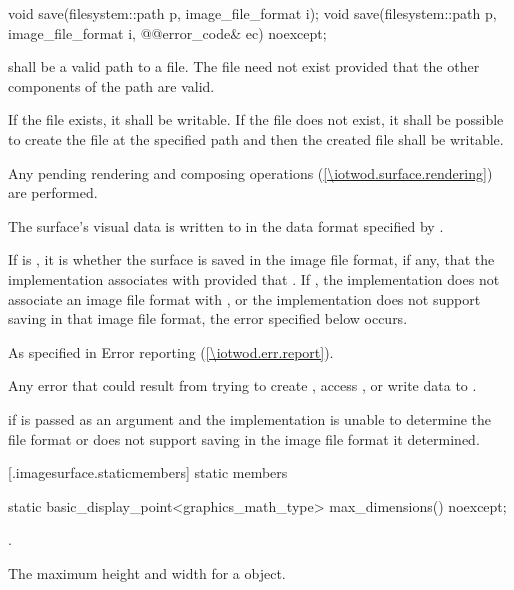 %
\begin{itemdecl}
void save(filesystem::path p, image_file_format i);
void save(filesystem::path p, image_file_format i, @\stdqualifier{}@error_code& ec) noexcept;
\end{itemdecl}
\begin{itemdescr}
\pnum
\requires
{} shall be a valid path to a file. The file need not exist provided that the other components of the path are valid.

\pnum
If the file exists, it shall be writable. If the file does not exist, it shall be possible to create the file at the specified path and then the created file shall be writable.

\pnum
\effects
Any pending rendering and composing operations (\ref{\iotwod.surface.rendering}) are performed.

\pnum
The surface's visual data is written to  in the data format specified by .

\pnum
If  is , it is  whether the surface is saved in the image file format, if any, that the implementation associates with  provided that . If , the implementation does not associate an image file format with , or the implementation does not support saving in that image file format, the error specified below occurs.

\pnum
\throws
As specified in Error reporting (\ref{\iotwod.err.report}).

\pnum
\errors
Any error that could result from trying to create , access , or write data to .

\pnum
{} if  is passed as an argument and the implementation is unable to determine the file format or does not support saving in the image file format it determined.
\end{itemdescr}

 [\iotwod.imagesurface.staticmembers] { static members}

%
\begin{itemdecl}
static basic_display_point<graphics_math_type> max_dimensions() noexcept;
\end{itemdecl}
\begin{itemdescr}
\pnum
\returns {}.

\pnum
\remarks
The maximum height and width for a  object.
\end{itemdescr}

